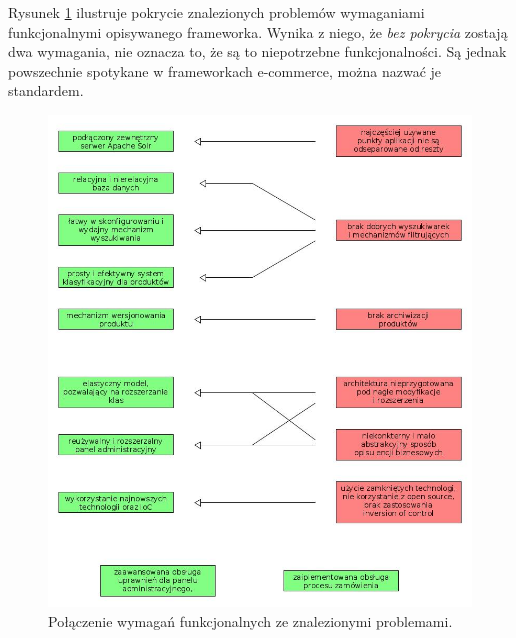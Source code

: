 Rysunek \ref{wymagania} ilustruje pokrycie znalezionych problemów wymaganiami funkcjonalnymi opisywanego frameworka. Wynika z niego, że \textit{bez pokrycia} zostają dwa wymagania, nie oznacza to, że są to niepotrzebne funkcjonalności. Są jednak powszechnie spotykane w frameworkach e-commerce, można nazwać je standardem. 
\begin{figure}
	\begin{center}
		\includegraphics[width=1\textwidth]{wymagania.jpg}
	\end{center}
	\caption{{\color{dgray}Połączenie wymagań funkcjonalnych ze znalezionymi problemami.}} \label{wymagania}
\end{figure}
